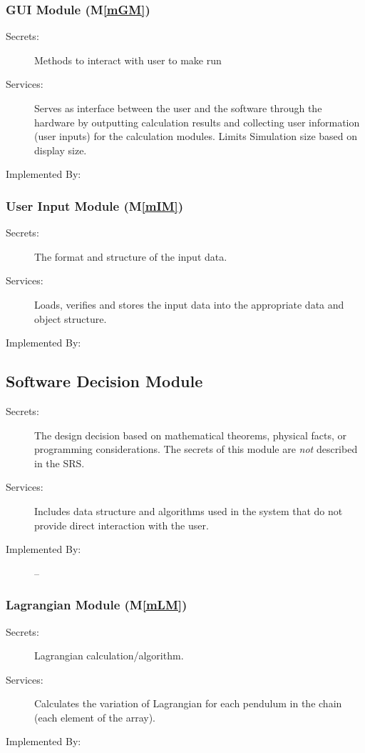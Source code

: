 \documentclass[12pt, titlepage]{article}
\newcommand{\mref}[1]{M\ref{#1}}
\begin{document}
\subsubsection{\progname GUI Module (\mref{mGM})}
\label{MG_GUI}
\begin{description}
\item[Secrets:] Methods to interact with user to make run \progname
\item[Services:] Serves as interface between the user and the software through 
the hardware by outputting calculation results and collecting user information 
(user inputs) for the calculation modules. Limits Simulation size based on
display size.
\item[Implemented By:] \progname
\end{description}

\subsubsection{User Input Module (\mref{mIM})}
\label{MG_InputFormat}
\begin{description}
\item[Secrets:] The format and structure of the input data.
\item[Services:] Loads, verifies and stores the input data into the appropriate 
data and object structure.
\item[Implemented By:] \progname
\end{description}

\subsection{Software Decision Module}

\begin{description}
\item[Secrets:] The design decision based on mathematical theorems, physical
  facts, or programming considerations. The secrets of this module are
  \emph{not} described in the SRS.
\item[Services:] Includes data structure and algorithms used in the system that
  do not provide direct interaction with the user. 
\item[Implemented By:] --
\end{description}

\subsubsection{Lagrangian Module  (\mref{mLM})}
\label{MG_LA}
\begin{description}
\item[Secrets:] Lagrangian calculation/algorithm.
\item[Services:] Calculates the variation of Lagrangian for each pendulum in 
the chain (each element of the array).
\item[Implemented By:] \progname
\end{description}
\end{document}
